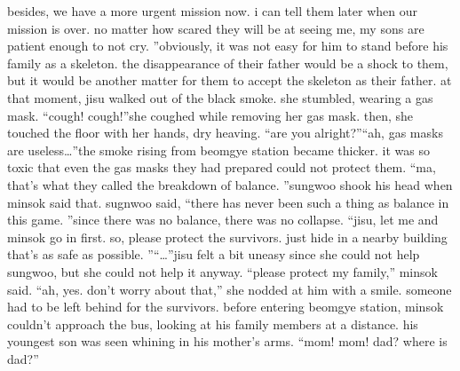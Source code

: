  besides, we have a more urgent mission now.
 i can tell them later when our mission is over.
 no matter how scared they will be at seeing me, my sons are patient enough to not cry.
”obviously, it was not easy for him to stand before his family as a skeleton.
the disappearance of their father would be a shock to them, but it would be another matter for them to accept the skeleton as their father.
at that moment, jisu walked out of the black smoke.
 she stumbled, wearing a gas mask.
“cough! cough!”she coughed while removing her gas mask.
 then, she touched the floor with her hands, dry heaving.
“are you alright?”“ah, gas masks are useless…”the smoke rising from beomgye station became thicker.
 it was so toxic that even the gas masks they had prepared could not protect them.
“ma, that’s what they called the breakdown of balance.
”sungwoo shook his head when minsok said that.
sugnwoo said, “there has never been such a thing as balance in this game.
”since there was no balance, there was no collapse.
“jisu, let me and minsok go in first.
 so, please protect the survivors.
 just hide in a nearby building that’s as safe as possible.
”“…”jisu felt a bit uneasy since she could not help sungwoo, but she could not help it anyway.
“please protect my family,” minsok said.
“ah, yes.
 don’t worry about that,” she nodded at him with a smile.
 someone had to be left behind for the survivors.
before entering beomgye station, minsok couldn’t approach the bus, looking at his family members at a distance.
 his youngest son was seen whining in his mother’s arms.
“mom! mom! dad? where is dad?”

